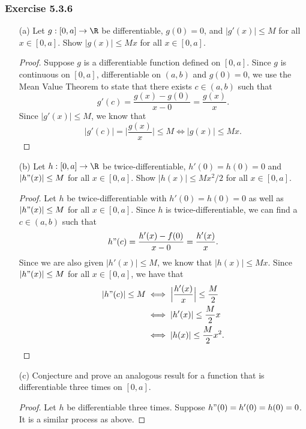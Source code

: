 \subsubsection{Exercise 5.3.6} 
\begin{enumerate}
    \item[(a)] Let \( g: [0,a] \to \R  \) be differentiable, \( g(0) = 0  \), and \( | g'(x)  | \leq M  \) for all \( x \in [0,a]  \). Show \( | g(x)  | \leq M x  \) for all \( x \in [0,a] \).
        \begin{proof}
            Suppose \( g  \) is a differentiable function defined on \( [0,a]  \). Since \( g  \) is continuous on \( [0,a]  \), differentiable on \( (a,b) \) and \( g(0) = 0  \), we use the Mean Value Theorem to state that there exists \( c \in (a,b)  \) such that
            \[ g'(c) = \frac{ g(x) - g(0)  }{ x - 0  } = \frac{ g(x)  }{ x }.\]
            Since \( | g'(x)  | \leq M  \), we know that 
            \[ | g'(c)  | = \Big| \frac{ g(x)  }{ x  }  \Big| \leq M \iff | g(x)  | \leq Mx.  \]
        \end{proof}
    \item[(b)] Let \( h: [0,a] \to \R  \) be twice-differentiable, \( h'(0) = h(0) = 0   \) and \( | h"(x)  | \leq M  \) for all \( x \in [0,a]  \). Show \( | h(x)  | \leq M x^2 / 2  \) for all \( x \in [0,a]  \). 
        \begin{proof}
            Let \( h  \) be twice-differentiable with \( h'(0) = h(0) = 0  \) as well as \( | h"(x)  |  \leq M  \) for all \( x \in [0,a] \). Since \( h  \) is twice-differentiable, we can find a \( c \in (a,b)  \) such that 
            \[  h"(c) =   \frac{ h'(x) - f(0) }{x  - 0  } = \frac{ h'(x) }{ x }. \]
            Since we are also given \( | h'(x)  | \leq M  \), we know that \( | h(x)  | \leq M x  \). Since \( | h"(x)  | \leq M  \) for all \( x \in [0,a]  \), we have that 
    \begin{align*}
        | h"(c)  | \leq M &\iff \Big| \frac{ h'(x)  }{ x  }  \Big| \leq \frac{ M }{ 2 }    \\
                          &\iff | h'(x)  | \leq \frac{ M }{ 2 }  x \\
                          &\iff | h(x)  | \leq  \frac{ M  }{ 2 } x^2.
    \end{align*}
        \end{proof}
    \item[(c)] Conjecture and prove an analogous result for a function that is differentiable three times on \( [0,a]  \).
        \begin{proof} 
        Let \( h  \) be differentiable three times. Suppose \( h"(0) = h'(0) = h(0) = 0 \). It is a similar process as above.
        \end{proof}
\end{enumerate}

